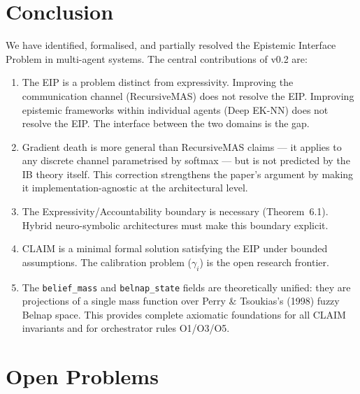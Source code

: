 \documentclass[11pt,a4paper]{article}
\theoremstyle{plain}
\theoremstyle{definition}
\theoremstyle{remark}
\begin{document}
\section{Conclusion}

We have identified, formalised, and partially resolved the Epistemic Interface
Problem in multi-agent systems. The central contributions of v0.2 are:

\begin{enumerate}[leftmargin=*]
\item The EIP is a problem distinct from expressivity. Improving the communication
channel (RecursiveMAS) does not resolve the EIP. Improving epistemic frameworks
within individual agents (Deep EK-NN) does not resolve the EIP. The interface
between the two domains is the gap.

\item Gradient death is more general than RecursiveMAS claims --- it applies to
any discrete channel parametrised by softmax --- but is not predicted by the IB
theory itself. This correction strengthens the paper's argument by making it
implementation-agnostic at the architectural level.

\item The Expressivity/Accountability boundary is necessary (Theorem~6.1).
Hybrid neuro-symbolic architectures must make this boundary explicit.

\item CLAIM is a minimal formal solution satisfying the EIP under bounded
assumptions. The calibration problem ($\gamma_i$) is the open research frontier.

\item The \texttt{belief\_mass} and \texttt{belnap\_state} fields are theoretically
unified: they are projections of a single mass function over Perry \& Tsoukias's
(1998) fuzzy Belnap space. This provides complete axiomatic foundations for all
CLAIM invariants and for orchestrator rules O1/O3/O5.
\end{enumerate}

\section{Open Problems}
\end{document}
